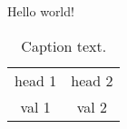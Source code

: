 \documentclass[12pt, a4paper]{article}
\begin{document}
Hello world!

\begin{table}
    \centering
    \begin{tabular}{cc}
        head 1 & head 2 \\
        val 1 & val 2 
    \end{tabular}
    \caption{Caption text.
    \label{tab1}
    }
\end{table}
\end{document}

